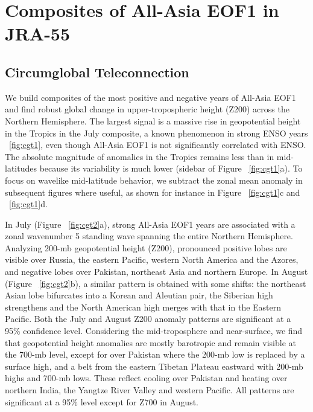 \section{Composites of All-Asia EOF1 in JRA-55}

\subsection{Circumglobal Teleconnection}

	We build composites of the most positive and negative years of All-Asia EOF1 and find robust global change in upper-tropospheric height (Z200) across the Northern Hemisphere. The largest signal is a massive rise in geopotential height in the Tropics in the July composite, a known phenomenon in strong ENSO years ~\ref{fig:cgt1}, even though All-Asia EOF1 is not significantly correlated with ENSO. The absolute magnitude of anomalies in the Tropics remains less than in mid-latitudes because its variability is much lower (sidebar of Figure ~\ref{fig:cgt1}a). To focus on wavelike mid-latitude behavior, we subtract the zonal mean anomaly in subsequent figures where useful, as shown for instance in Figure ~\ref{fig:cgt1}c and ~\ref{fig:cgt1}d.
	
	In July (Figure ~\ref{fig:cgt2}a), strong All-Asia EOF1 years are associated with a zonal wavenumber 5 standing wave spanning the entire Northern Hemisphere. Analyzing 200-mb geopotential height (Z200),  pronounced positive lobes are visible over Russia, the eastern Pacific, western North America and the Azores, and negative lobes over Pakistan, northeast Asia and northern Europe. In August (Figure ~\ref{fig:cgt2}b), a similar pattern is obtained with some shifts: the northeast Asian lobe bifurcates into a Korean and Aleutian pair, the Siberian high strengthens and the North American high merges with that in the Eastern Pacific. Both the July and August Z200 anomaly patterns are significant at a 95\% confidence level. Considering the mid-troposphere and near-surface, we find that geopotential height anomalies are mostly barotropic and remain visible at the 700-mb level, except for over Pakistan where the 200-mb low is replaced by a surface high, and a belt from the eastern Tibetan Plateau eastward with 200-mb highs and 700-mb lows. These reflect cooling over Pakistan and heating over northern India, the Yangtze River Valley and western Pacific. All patterns are significant at a 95\% level except for Z700 in August.
	
